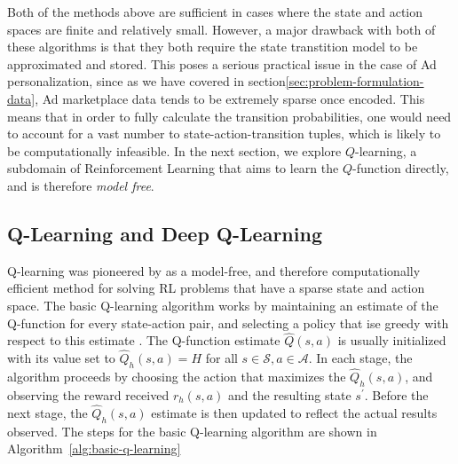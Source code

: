 \documentclass{mldsmsc}
\begin{document}
Both of the methods above are sufficient in cases where the state and action spaces are finite
and relatively small. However, a major drawback with both of these algorithms is that they both
require the state transtition model to be approximated and stored. This poses a serious practical
issue in the case of Ad personalization, since as we have covered in section\ref{sec:problem-formulation-data},
Ad marketplace data tends to be extremely sparse once encoded. This means that in order to fully
calculate the transition probabilities, one would need to account for a vast number to state-action-transition
tuples, which is likely to be computationally infeasible. In the next section, we explore $Q$-learning,
a subdomain of Reinforcement Learning that aims to learn the $Q$-function directly, and is therefore 
\emph{model free}.

\subsection{Q-Learning and Deep Q-Learning}

Q-learning was pioneered by \cite{RefWorks:watkins1989learning} as a model-free, and therefore
computationally efficient method for solving RL problems that have a sparse state
and action space. The basic Q-learning algorithm works by maintaining an estimate
of the Q-function for every state-action pair, and selecting a policy that
ise greedy with respect to this estimate \citep{pike-burke2024LearnigAgents}.
The Q-function estimate $\hat{Q}(s,a)$ is usually initialized with its value
set to $\hat{Q}_{h}(s,a) = H$ for all $s \in \mathcal{S}, a \in \mathcal{A}$.
In each stage, the algorithm proceeds by choosing the action that maximizes the
$\hat{Q}_{h}(s,a)$, and observing the reward received $r_h(s,a)$ and the
resulting state $s^\prime$. Before the next stage, the $\hat{Q}_{h}(s,a)$
estimate is then updated to reflect the actual results observed. The steps
for the basic Q-learning algorithm are shown in Algorithm~\ref{alg:basic-q-learning}
\end{document}
